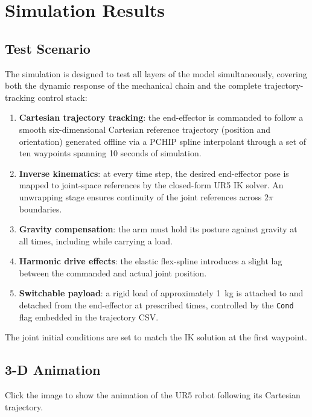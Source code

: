 \chapter{Simulation Results}
\label{chap:results}

\section{Test Scenario}

The simulation is designed to test all layers of the model simultaneously, covering both the dynamic response of the mechanical chain and the complete trajectory-tracking control stack:
\begin{enumerate}
  \item \textbf{Cartesian trajectory tracking}: the end-effector is commanded to follow a smooth six-dimensional Cartesian reference trajectory (position and orientation) generated offline via a PCHIP spline interpolant through a set of ten waypoints spanning 10 seconds of simulation.
  \item \textbf{Inverse kinematics}: at every time step, the desired end-effector pose is mapped to joint-space references by the closed-form UR5 IK solver. An unwrapping stage ensures continuity of the joint references across $2\pi$ boundaries.
  \item \textbf{Gravity compensation}: the arm must hold its posture against gravity at all times, including while carrying a load.
  \item \textbf{Harmonic drive effects}: the elastic flex-spline introduces a slight lag between the commanded and actual joint position.
  \item \textbf{Switchable payload}: a rigid load of approximately 1~kg is attached to and detached from the end-effector at prescribed times, controlled by the \texttt{Cond} flag embedded in the trajectory CSV.
\end{enumerate}

The joint initial conditions are set to match the IK solution at the first waypoint.

\section{3-D Animation}

Click the image  to show the animation of the UR5 robot following its Cartesian trajectory.

